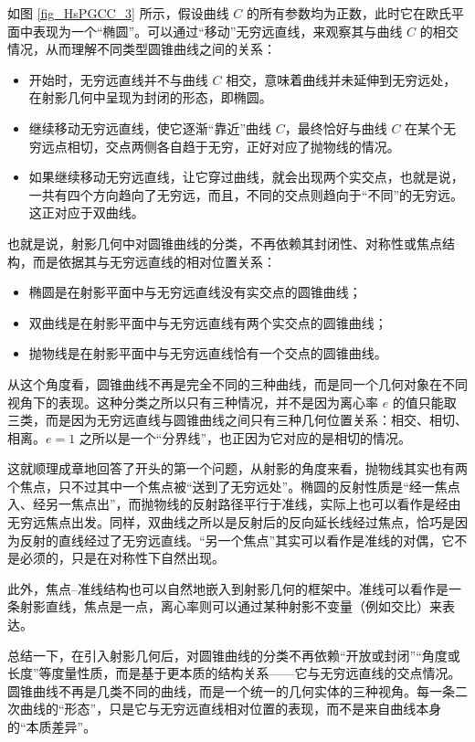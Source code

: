 如图 \autoref{fig_HsPGCC_3} 所示，假设曲线 $C$ 的所有参数均为正数，此时它在欧氏平面中表现为一个“椭圆”。可以通过“移动”无穷远直线，来观察其与曲线 $C$ 的相交情况，从而理解不同类型圆锥曲线之间的关系：
\begin{itemize}
\item 开始时，无穷远直线并不与曲线 $C$ 相交，意味着曲线并未延伸到无穷远处，在射影几何中呈现为封闭的形态，即椭圆。
\item 继续移动无穷远直线，使它逐渐“靠近”曲线 $C$，最终恰好与曲线 $C$ 在某个无穷远点相切，交点两侧各自趋于无穷，正好对应了抛物线的情况。
\item 如果继续移动无穷远直线，让它穿过曲线，就会出现两个实交点，也就是说，一共有四个方向趋向了无穷远，而且，不同的交点则趋向于“不同”的无穷远。这正对应于双曲线。
\end{itemize}
也就是说，射影几何中对圆锥曲线的分类，不再依赖其封闭性、对称性或焦点结构，而是依据其与无穷远直线的相对位置关系：
\begin{itemize}
\item 椭圆是在射影平面中与无穷远直线没有实交点的圆锥曲线；
\item 双曲线是在射影平面中与无穷远直线有两个实交点的圆锥曲线；
\item 抛物线是在射影平面中与无穷远直线恰有一个交点的圆锥曲线。
\end{itemize}
从这个角度看，圆锥曲线不再是完全不同的三种曲线，而是同一个几何对象在不同视角下的表现。这种分类之所以只有三种情况，并不是因为离心率 $e$ 的值只能取三类，而是因为无穷远直线与圆锥曲线之间只有三种几何位置关系：相交、相切、相离。$e=1$ 之所以是一个“分界线”，也正因为它对应的是相切的情况。

这就顺理成章地回答了开头的第一个问题，从射影的角度来看，抛物线其实也有两个焦点，只不过其中一个焦点被“送到了无穷远处”。椭圆的反射性质是“经一焦点入、经另一焦点出”，而抛物线的反射路径平行于准线，实际上也可以看作是经由无穷远焦点出发。同样，双曲线之所以是反射后的反向延长线经过焦点，恰巧是因为反射的直线经过了无穷远直线。“另一个焦点”其实可以看作是准线的对偶，它不是必须的，只是在对称性下自然出现。

此外，焦点–准线结构也可以自然地嵌入到射影几何的框架中。准线可以看作是一条射影直线，焦点是一点，离心率则可以通过某种射影不变量（例如交比）来表达。

总结一下，在引入射影几何后，对圆锥曲线的分类不再依赖“开放或封闭”“角度或长度”等度量性质，而是基于更本质的结构关系——它与无穷远直线的交点情况。圆锥曲线不再是几类不同的曲线，而是一个统一的几何实体的三种视角。每一条二次曲线的“形态”，只是它与无穷远直线相对位置的表现，而不是来自曲线本身的“本质差异”。

